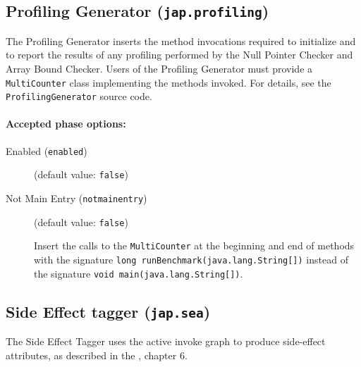 \documentclass{article}
\begin{document}
\subsection{Profiling Generator ({\tt jap.profiling})}


\par

The Profiling Generator inserts the method invocations required
to initialize and to report the results of any profiling
performed by the Null Pointer Checker and Array Bound
Checker. Users of the Profiling Generator must provide a
{\tt MultiCounter} class implementing the methods invoked. For
details, see the {\tt ProfilingGenerator} source code.



\paragraph{Accepted phase options:} 

\begin{description}

\item[Enabled ({\tt enabled})]
(default value: {\tt false})






\item[Not Main Entry ({\tt notmainentry})]
(default value: {\tt false})





\par

Insert the calls to the {\tt MultiCounter} at the
beginning and end of methods with the signature
{\tt long runBenchmark(java.lang.String[])}
instead of the signature
{\tt void main(java.lang.String[])}.



\end{description}

\subsection{Side Effect tagger ({\tt jap.sea})}


\par

The Side Effect Tagger
uses the active invoke graph to produce side-effect attributes, as
described in the , chapter 6.
\end{document}

